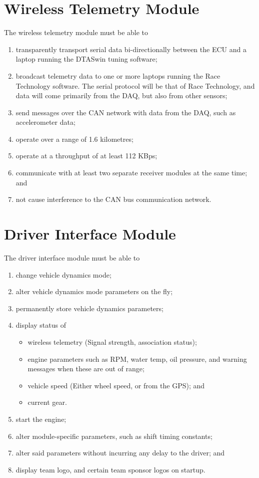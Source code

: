 \section{Wireless Telemetry Module}
The wireless telemetry module must be able to
\begin{enumerate}
 \item transparently transport serial data bi-directionally between the ECU and a laptop running the DTASwin tuning software;
 \item broadcast telemetry data to one or more laptops running the Race Technology
software. The serial protocol will be that of Race Technology, and data will
come primarily from the DAQ, but also from other sensors; 
 \item send messages over the CAN network with data from the DAQ, such as accelerometer data;
 \item operate over a range of 1.6 kilometres;
 \item operate at a throughput of at least 112 KBps; 
 \item communicate with at least two separate receiver modules at the same time; and
 \item not cause interference to the CAN bus communication network.
\end{enumerate}

\section{Driver Interface Module}
The driver interface module must be able to
\begin{enumerate}
 \item change vehicle dynamics mode;
 \item alter vehicle dynamics mode parameters on the fly;
 \item permanently store vehicle dynamics parameters;
 \item display status of
  \begin{itemize}
    \item wireless telemetry (Signal strength, association status);
    \item engine parameters such as RPM, water temp, oil pressure, and warning messages when these are out of range;
    \item vehicle speed (Either wheel speed, or from the GPS); and
    \item current gear.
  \end{itemize}
 \item start the engine;
 \item alter module-specific parameters, such as shift timing constants; 
 \item alter said parameters without incurring any delay to the driver; and
 \item display team logo, and certain team sponsor logos on startup.
\end{enumerate}
